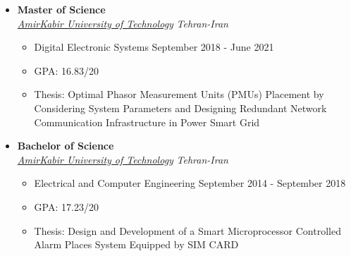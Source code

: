 \documentclass[11pt,a4paper,sans]{moderncv} %
\newcommand*{\authorimg}[1]{%
	\raisebox{-.3\baselineskip}{%
		\texttt{[image: \#1]}%
	}%
}
\begin{document}
\begin{itemize}
    \item \textbf{Master of Science} \hfill \\ 
    \href{https://aut.ac.ir/}{\authorimg{Images/aut.png} \emph{AmirKabir University of Technology}} \hfill \emph{Tehran-Iran}
    \begin{itemize}
        \item Digital Electronic Systems \hfill September 2018 - June 2021
        \item GPA: 16.83/20
        \item Thesis: Optimal Phasor Measurement Units (PMUs) Placement by Considering System Parameters and Designing Redundant Network Communication Infrastructure in Power Smart Grid
    \end{itemize}
\end{itemize}


\begin{itemize}
    \item \textbf{Bachelor of Science} \hfill \\ 
    \href{https://aut.ac.ir/}{\authorimg{Images/aut.png} \emph{AmirKabir University of Technology}} \hfill \emph{Tehran-Iran}
    \begin{itemize}
        \item Electrical and Computer Engineering \hfill September 2014 - September 2018
        \item GPA: 17.23/20	
        \item Thesis: Design and Development of a Smart Microprocessor Controlled Alarm Places System Equipped by SIM CARD
    \end{itemize}
\end{itemize}




\end{document}
